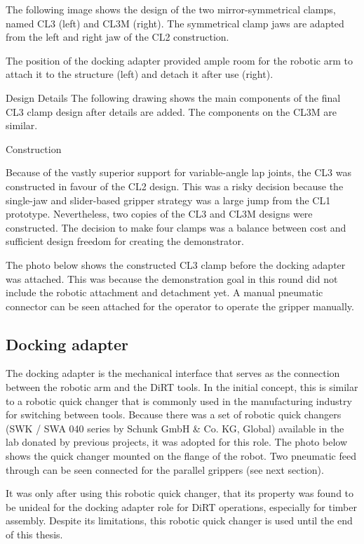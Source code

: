 The following image shows the design of the two mirror-symmetrical clamps, named CL3 (left) and CL3M (right). The symmetrical clamp jaws are adapted from the left and right jaw of the CL2 construction.

The position of the docking adapter provided ample room for the robotic arm to attach it to the structure (left) and detach it after use (right). 

Design Details
The following drawing shows the main components of the final CL3 clamp design after details are added. The components on the CL3M are similar.


Construction

Because of the vastly superior support for variable-angle lap joints, the CL3 was constructed in favour of the CL2 design. This was a risky decision because the single-jaw and slider-based gripper strategy was a large jump from the CL1 prototype. Nevertheless, two copies of the CL3 and CL3M designs were constructed. The decision to make four clamps was a balance between cost and sufficient design freedom for creating the demonstrator.

The photo below shows the constructed CL3 clamp before the docking adapter was attached. This was because the demonstration goal in this round did not include the robotic attachment and detachment yet. A manual pneumatic connector can be seen attached for the operator to operate the gripper manually.

\subsection{Docking adapter}
\label{subsection:exploration_2_docking_adapter}

The docking adapter is the mechanical interface that serves as the connection between the robotic arm and the DiRT tools. In the initial concept, this is similar to a robotic quick changer that is commonly used in the manufacturing industry for switching between tools. Because there was a set of robotic quick changers (SWK / SWA 040 series by Schunk GmbH \& Co. KG, Global) available in the lab donated by previous projects, it was adopted for this role. The photo below shows the quick changer mounted on the flange of the robot. Two pneumatic feed through can be seen connected for the parallel grippers (see next section).

It was only after using this robotic quick changer, that its property was found to be unideal for the docking adapter role for DiRT operations, especially for timber assembly. Despite its limitations, this robotic quick changer is used until the end of this thesis.

